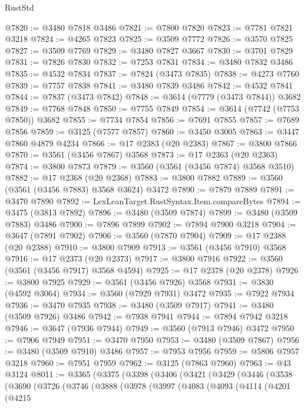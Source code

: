 \begin{lexlean}{RustStd}
\begin{coremodule}
@7820 := @3480 @7818 @3486
@7821 := @7800 @7820
@7823 := @7781 @7821 @3218
@7824 := @4265 @7823
@7825 := @3509 @7772
@7826 := @3570 @7825
@7827 := @3509 @7769
@7829 := @3480 @7827 @3667
@7830 := @3701 @7829
@7831 := @7826 @7830
@7832 := @7253 @7831
@7834 := @3480 @7832 @3486
@7835 := @4532 @7834
@7837 := @7824 (@3473 @7835)
@7838 := @4273 @7760
@7839 := @7757 @7838
@7841 := @3480 @7839 @3486
@7842 := @4532 @7841
@7844 := @7837 (@3473 @7842)
@7848 := @3614 (@7779 (@3473 @7844)) @3682
@7849 := @7768 @7848
@7850 := @7755 @7849
@7854 := @3614 (@7742 (@7753 @7850)) @3682
@7855 := @7734 @7854
@7856 := @7691 @7855
@7857 := @7689 @7856
@7859 := @3125 (@7577 @7857)
@7860 := @3450 @3005
@7863 := @3447 @7860 @4879 @4234
@7866 := @17 @2383 (@20 @2383)
@7867 := @3800 @7866
@7870 := @3561 (@3456 @7867) @3568
@7873 := @17 @2363 (@20 @2363)
@7874 := @3800 @7873
@7879 := @3560 (@3561 (@3456 @7874) @3568 @3510)
@7882 := @17 @2368 (@20 @2368)
@7883 := @3800 @7882
@7889 := @3560 (@3561 (@3456 @7883) @3568 @3624) @3472
@7890 := @7879 @7889
@7891 := @3470 @7890
@7892 := LexLeanTarget.RustSyntax.Item.compareBytes
@7894 := @3475 (@3813 @7892)
@7896 := @3480 (@3509 @7874)
@7899 := @3480 (@3509 @7883) @3486
@7900 := @7896 @7899
@7902 := @7894 @7900 @3218
@7904 := @3647 (@7891 @7902)
@7906 := @3560 (@7870 @7904)
@7909 := @17 @2388 (@20 @2388)
@7910 := @3800 @7909
@7913 := @3561 (@3456 @7910) @3568
@7916 := @17 @2373 (@20 @2373)
@7917 := @3800 @7916
@7922 := @3560 (@3561 (@3456 @7917) @3568 @4594)
@7925 := @17 @2378 (@20 @2378)
@7926 := @3800 @7925
@7929 := @3561 (@3456 @7926) @3568
@7931 := @3830 (@4592 @3064)
@7934 := @3560 (@7929 @7931) @3472
@7935 := @7922 @7934
@7936 := @3470 @7935
@7938 := @3480 (@3509 @7917)
@7941 := @3480 (@3509 @7926) @3486
@7942 := @7938 @7941
@7944 := @7894 @7942 @3218
@7946 := @3647 (@7936 @7944)
@7949 := @3560 (@7913 @7946) @3472
@7950 := @7906 @7949
@7951 := @3470 @7950
@7953 := @3480 (@3509 @7867)
@7956 := @3480 (@3509 @7910) @3486
@7957 := @7953 @7956
@7959 := @5806 @7957 @3218
@7960 := @7951 @7959
@7962 := @3125 (@7863 @7960)
@7963 := @43 @3124
@8011 := @3365
    (@3375
      (@3398
        (@3406
          (@3421
            (@3429
              (@3446
                (@3538
                  (@3690
                    (@3726
                      (@3746
                        (@3888
                          (@3978
                            (@3997
                              (@4083
                                (@4093
                                  (@4114
                                    (@4201
                                      (@4215

\end{coremodule}
\end{lexlean}
